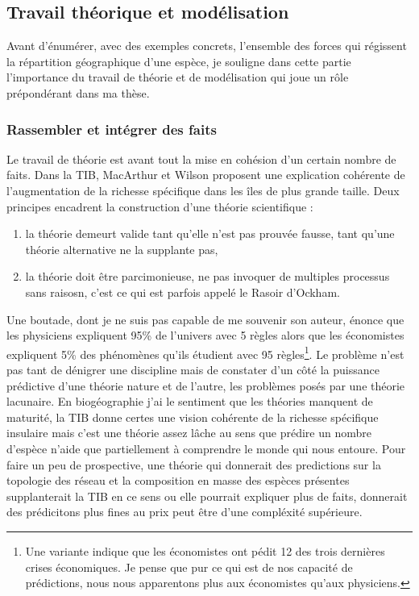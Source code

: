 \subsection*{Travail théorique et
modélisation}\label{travail-thuxe9orique-et-moduxe9lisation}

Avant d'énumérer, avec des exemples concrets, l'ensemble des forces qui
régissent la répartition géographique d'une espèce, je souligne dans
cette partie l'importance du travail de théorie et de modélisation qui
joue un rôle prépondérant dans ma thèse.

\subsubsection*{Rassembler et intégrer des
faits}\label{rassembler-et-intuxe9grer-des-faits}

Le travail de théorie est avant tout la mise en cohésion d'un certain
nombre de faits. Dans la TIB, MacArthur et Wilson proposent une
explication cohérente de l'augmentation de la richesse spécifique dans
les îles de plus grande taille. Deux principes encadrent la construction
d'une théorie scientifique :

\begin{enumerate}
\def\labelenumi{\arabic{enumi}.}
\tightlist
\item
  la théorie demeurt valide tant qu'elle n'est pas prouvée fausse, tant
  qu'une théorie alternative ne la supplante pas,\\
\item
  la théorie doit être parcimonieuse, ne pas invoquer de multiples
  processus sans raisosn, c'est ce qui est parfois appelé le Rasoir
  d'Ockham.
\end{enumerate}

Une boutade, dont je ne suis pas capable de me souvenir son auteur,
énonce que les physiciens expliquent 95\% de l'univers avec 5 règles
alors que les économistes expliquent 5\% des phénomènes qu'ils étudient
avec 95 règles\footnote{Une variante indique que les économistes ont
  pédit 12 des trois dernières crises économiques. Je pense que pur ce
  qui est de nos capacité de prédictions, nous nous apparentons plus aux
  économistes qu'aux physiciens.}. Le problème n'est pas tant de
dénigrer une discipline mais de constater d'un côté la puissance
prédictive d'une théorie nature et de l'autre, les problèmes posés par
une théorie lacunaire. En biogéographie j'ai le sentiment que les
théories manquent de maturité, la TIB donne certes une vision cohérente
de la richesse spécifique insulaire mais c'est une théorie assez lâche
au sens que prédire un nombre d'espèce n'aide que partiellement à
comprendre le monde qui nous entoure. Pour faire un peu de prospective,
une théorie qui donnerait des predictions sur la topologie des réseau et
la composition en masse des espèces présentes supplanterait la TIB en ce
sens ou elle pourrait expliquer plus de faits, donnerait des prédicitons
plus fines au prix peut être d'une compléxité supérieure.

